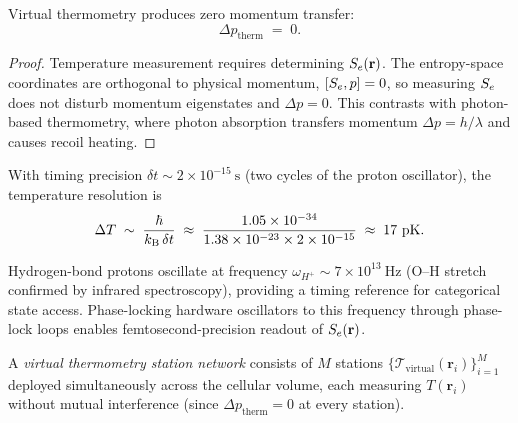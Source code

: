 \begin{theorem}
\label{thm:ch03-zero-backaction}
Virtual thermometry produces zero momentum transfer:
\begin{equation}
    \Delta p_\mathrm{therm} \;=\; 0.
    \label{eq:ch03-zero-backaction}
\end{equation}
\end{theorem}

\begin{proof}
Temperature measurement requires determining $S_e(\mathbf{r})$.  The
entropy-space coordinates are orthogonal to physical momentum,
$[S_e,p]=0$, so measuring $S_e$ does not disturb momentum eigenstates and
$\Delta p=0$.  This contrasts with photon-based thermometry, where photon
absorption transfers momentum $\Delta p=h/\lambda$ and causes recoil heating.
\end{proof}

\begin{corollary}
\label{cor:ch03-picokelvin}
With timing precision $\delta t\sim 2\times10^{-15}~\mathrm{s}$ (two cycles of
the proton oscillator), the temperature resolution is
\begin{equation}
    \Delta T
    \;\sim\;
    \frac{\hbar}{k_{\mathrm{B}}\,\delta t}
    \;\approx\;
    \frac{1.05\times10^{-34}}{1.38\times10^{-23}\times 2\times10^{-15}}
    \;\approx\;
    17~\mathrm{pK}.
    \label{eq:ch03-picokelvin}
\end{equation}
\end{corollary}

\begin{proposition}
\label{prop:ch03-hw-sync}
Hydrogen-bond protons oscillate at frequency $\omega_{H^+}\sim 7\times10^{13}~\mathrm{Hz}$
(O--H stretch confirmed by infrared spectroscopy), providing a timing reference
for categorical state access.  Phase-locking hardware oscillators to this
frequency through phase-lock loops enables femtosecond-precision readout of
$S_e(\mathbf{r})$.
\end{proposition}

\begin{definition}
\label{def:ch03-station-network}
A \emph{virtual thermometry station network} consists of $M$ stations
$\{\mathcal{T}_\mathrm{virtual}(\mathbf{r}_i)\}_{i=1}^M$ deployed simultaneously
across the cellular volume, each measuring $T(\mathbf{r}_i)$ without mutual
interference (since $\Delta p_\mathrm{therm}=0$ at every station).
\end{definition}

